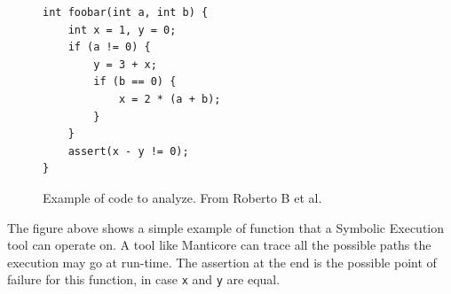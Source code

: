 \begin{figure}[H]
\centering
\begin{BVerbatim}
int foobar(int a, int b) {
    int x = 1, y = 0;
    if (a != 0) {
        y = 3 + x;
        if (b == 0) {
            x = 2 * (a + b);
        }
    }
    assert(x - y != 0);
}
\end{BVerbatim}
\caption{Example of code to analyze. From Roberto B et al.\cite{symbolicExecutionDef}}
\end{figure}

The figure above shows a simple example of function that a Symbolic Execution tool can operate on. A tool like Manticore can trace all the possible paths the execution may go at run-time. The assertion at the end is the possible point of failure for this function, in case \texttt{x} and \texttt{y} are equal.

